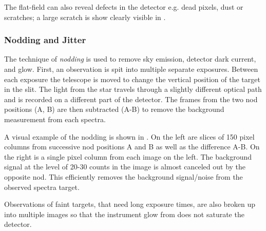 The flat-field can also reveal defects in the detector e.g. dead pixels, dust or scratches; a large scratch is show clearly visible in .

\subsubsection{Nodding and Jitter}
\label{subsec:nod-jitter}
The technique of \emph{nodding} is used to remove sky emission, detector dark current, and glow. First, an observation is spit into multiple separate exposures. Between each exposure the telescope is moved to change the vertical position of the target in the slit. The light from the star travels through a slightly different optical path and is recorded on a different part of the detector. The frames from the two nod positions (A, B) are then subtracted (A-B) to remove the background measurement from each spectra.

A visual example of the nodding is shown in . On the left are slices of 150 pixel columns from successive nod positions A and B as well as the difference A-B. On the right is a single pixel column from each image on the left. The background signal at the level of 20-30 counts in the image is almost canceled out by the opposite nod. This efficiently removes the background signal/noise from the observed spectra target.

Observations of faint targets, that need long exposure times, are also broken up into multiple images so that the instrument glow from  does not saturate the detector.


